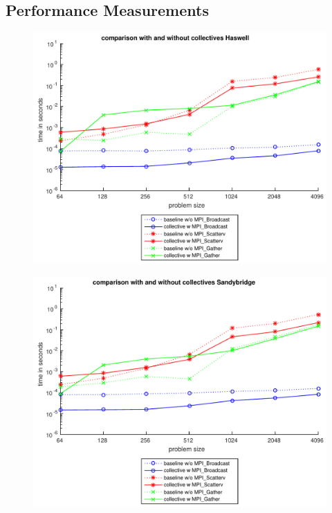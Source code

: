 \documentclass[9pt,pdftex,xcolor=dvipsnames]{beamer}
\begin{document}
\subsection{Performance Measurements}
\begin{frame}{\insertsubsection}
\begin{minipage}{0.45\textwidth}
\begin{figure}
\centering
\includegraphics[scale=0.3]{img/comparison_hw_collectives.pdf}
\end{figure}
\end{minipage}
\hspace{0.2cm}
\begin{minipage}{0.45\textwidth}
\begin{figure}
\centering
\includegraphics[scale=0.3]{img/comparison_sb_collectives.pdf}
\end{figure}
\end{minipage}
\end{frame}
\end{document}
